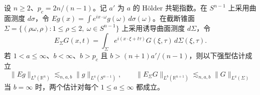 设 \(n\ge2\)、\(p_c=2n/(n-1)\)。记 \(a'\) 为 \(a\) 的 Hölder 共轭指数。在 \(S^{n-1}\) 上采用曲面测度 \(d\sigma\)，令 \(Eg(x)=\int e^{ix\cdot\omega}g(\omega)\,d\sigma(\omega)\)。在截断锥面 \(\Sigma=\{(\rho\omega,\rho):1\le\rho\le2,\ \omega\in S^{n-1}\}\) 上采用诱导曲面测度 \(d\Sigma\)，令
\[
 E_\Sigma G(x,t)=\int_\Sigma e^{i(x\cdot\xi+t\tau)}G(\xi,\tau)\,d\Sigma(\xi,\tau).
\]
若 \(1<a\le\infty\)、\(b<\infty\)、\(b>p_c\) 且 \(b>(n+1)a'/(n-1)\)，则以下强型估计成立
\[
 \|Eg\|_{L^b(\mathbb R^n)}\lesssim_{n,a,b}\|g\|_{L^a(S^{n-1})},\qquad
 \|E_\Sigma G\|_{L^b(\mathbb R^{n+1})}\lesssim_{n,a,b}\|G\|_{L^a(\Sigma)}
\]
当 \(b=\infty\) 时，两个估计对每个 \(1\le a\le\infty\) 都成立。
